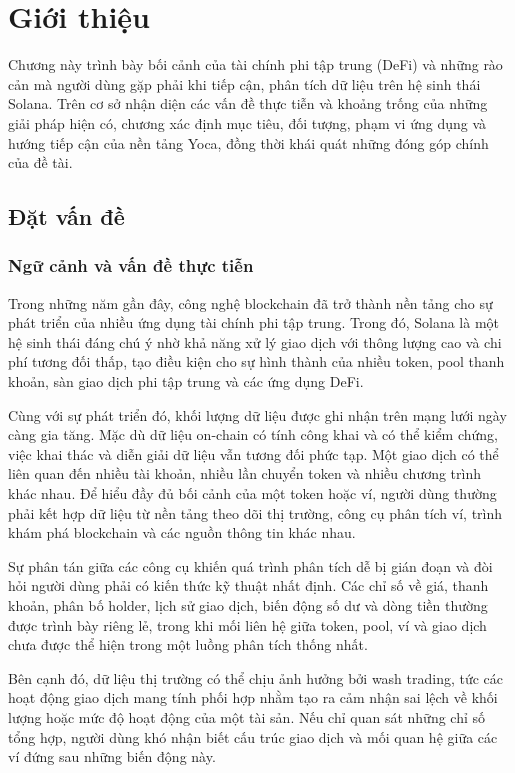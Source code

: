 \chapter{Giới thiệu}
\label{Chapter1}

Chương này trình bày bối cảnh của tài chính phi tập trung (DeFi) và những rào cản mà người dùng gặp phải khi tiếp cận, phân tích dữ liệu trên hệ sinh thái Solana. Trên cơ sở nhận diện các vấn đề thực tiễn và khoảng trống của những giải pháp hiện có, chương xác định mục tiêu, đối tượng, phạm vi ứng dụng và hướng tiếp cận của nền tảng Yoca, đồng thời khái quát những đóng góp chính của đề tài.

\section{Đặt vấn đề}
\label{sec:dat_van_de}

\subsection{Ngữ cảnh và vấn đề thực tiễn}

Trong những năm gần đây, công nghệ blockchain đã trở thành nền tảng cho sự phát triển của nhiều ứng dụng tài chính phi tập trung. Trong đó, Solana là một hệ sinh thái đáng chú ý nhờ khả năng xử lý giao dịch với thông lượng cao và chi phí tương đối thấp, tạo điều kiện cho sự hình thành của nhiều token, pool thanh khoản, sàn giao dịch phi tập trung và các ứng dụng DeFi.

Cùng với sự phát triển đó, khối lượng dữ liệu được ghi nhận trên mạng lưới ngày càng gia tăng. Mặc dù dữ liệu on-chain có tính công khai và có thể kiểm chứng, việc khai thác và diễn giải dữ liệu vẫn tương đối phức tạp. Một giao dịch có thể liên quan đến nhiều tài khoản, nhiều lần chuyển token và nhiều chương trình khác nhau. Để hiểu đầy đủ bối cảnh của một token hoặc ví, người dùng thường phải kết hợp dữ liệu từ nền tảng theo dõi thị trường, công cụ phân tích ví, trình khám phá blockchain và các nguồn thông tin khác nhau.

Sự phân tán giữa các công cụ khiến quá trình phân tích dễ bị gián đoạn và đòi hỏi người dùng phải có kiến thức kỹ thuật nhất định. Các chỉ số về giá, thanh khoản, phân bố holder, lịch sử giao dịch, biến động số dư và dòng tiền thường được trình bày riêng lẻ, trong khi mối liên hệ giữa token, pool, ví và giao dịch chưa được thể hiện trong một luồng phân tích thống nhất.

Bên cạnh đó, dữ liệu thị trường có thể chịu ảnh hưởng bởi wash trading, tức các hoạt động giao dịch mang tính phối hợp nhằm tạo ra cảm nhận sai lệch về khối lượng hoặc mức độ hoạt động của một tài sản. Nếu chỉ quan sát những chỉ số tổng hợp, người dùng khó nhận biết cấu trúc giao dịch và mối quan hệ giữa các ví đứng sau những biến động này.

